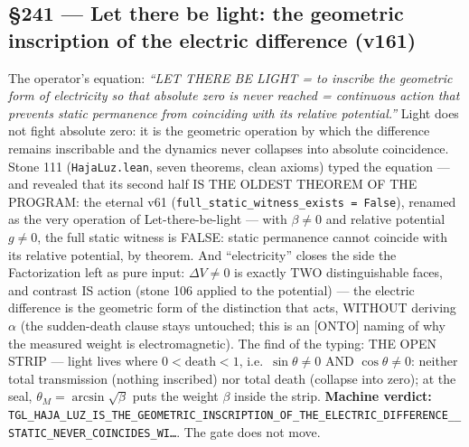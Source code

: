 \documentclass[11pt]{article}
\theoremstyle{definition}\newtheorem{deriv}{Derivation}
\begin{document}
\subsection*{\S241 --- Let there be light: the geometric inscription of the electric difference (v161)}The operator's equation: \emph{``LET THERE BE LIGHT = to inscribe the geometric form of electricity so that absolute zero is never reached = continuous action that prevents static permanence from coinciding with its relative potential.''} Light does not fight absolute zero: it is the geometric operation by which the difference remains inscribable and the dynamics never collapses into absolute coincidence. Stone 111 (\texttt{HajaLuz.lean}, seven theorems, clean axioms) typed the equation --- and revealed that its second half IS THE OLDEST THEOREM OF THE PROGRAM: the eternal v61 (\texttt{full\_static\_witness\_exists = False}), renamed as the very operation of Let-there-be-light --- with $\beta{\neq}0$ and relative potential $g{\neq}0$, the full static witness is FALSE: static permanence cannot coincide with its relative potential, by theorem. And ``electricity'' closes the side the Factorization left as pure input: $\Delta V{\neq}0$ is exactly TWO distinguishable faces, and contrast IS action (stone 106 applied to the potential) --- the electric difference is the geometric form of the distinction that acts, WITHOUT deriving $\alpha$ (the sudden-death clause stays untouched; this is an [ONTO] naming of why the measured weight is electromagnetic). The find of the typing: THE OPEN STRIP --- light lives where $0 < \mathrm{death} < 1$, i.e.\ $\sin\theta{\neq}0$ AND $\cos\theta{\neq}0$: neither total transmission (nothing inscribed) nor total death (collapse into zero); at the seal, $\theta_M{=}\arcsin\sqrt{\beta}$ puts the weight $\beta$ inside the strip. \textbf{Machine verdict:} \texttt{TGL\_HAJA\_LUZ\_IS\_THE\_GEOMETRIC\_INSCRIPTION\_OF\_THE\_ELECTRIC\_DIFFERENCE\_\_STATIC\_NEVER\_COINCIDES\_WI\ldots}. The gate does not move.
\end{document}
